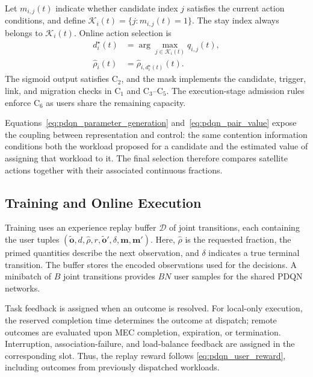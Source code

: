 Let $m_{i,j}(t)$ indicate whether candidate index $j$
satisfies the current action conditions, and define
$\mathcal{K}_i(t)=\{j:m_{i,j}(t)=1\}$.
The stay index always belongs to $\mathcal{K}_i(t)$.
Online action selection is
\begin{equation}
\begin{aligned}
d_i^\star(t)
&=\arg\max_{j\in\mathcal{K}_i(t)}q_{i,j}(t),\\
\widehat{\rho}_i(t)
&=\widehat{\rho}_{i,d_i^\star(t)}(t).
\end{aligned}
\label{eq:pdqn_joint_selection}
\end{equation}
The sigmoid output satisfies $\mathrm{C}_2$, and the mask
implements the candidate, trigger, link, and migration
checks in $\mathrm{C}_1$ and $\mathrm{C}_3$--$\mathrm{C}_5$.
The execution-stage admission rules enforce
$\mathrm{C}_6$ as users share the remaining capacity.

Equations~\eqref{eq:pdqn_parameter_generation}
and~\eqref{eq:pdqn_pair_value} expose the coupling between
representation and control: the same contention information
conditions both the workload proposed for a candidate and
the estimated value of assigning that workload to it.
The final selection therefore compares satellite actions
together with their associated continuous fractions.

\subsection{Training and Online Execution}
\label{subsec:training_execution}

Training uses an experience replay buffer $\mathcal{D}$
of joint transitions, each containing the user tuples
$(\widetilde{\mathbf{o}},d,\widehat{\rho},r,
\widetilde{\mathbf{o}}',\delta,\mathbf{m},\mathbf{m}')$.
Here, $\widehat{\rho}$ is the requested fraction,
the primed quantities describe the next observation,
and $\delta$ indicates a true terminal transition.
The buffer stores the encoded observations used for
the decisions. A minibatch of $B$ joint transitions
provides $BN$ user samples for the shared PDQN networks.

Task feedback is assigned when an outcome is resolved.
For local-only execution, the reserved completion time
determines the outcome at dispatch; remote outcomes
are evaluated upon MEC completion, expiration, or
termination. Interruption, association-failure, and
load-balance feedback are assigned in the corresponding
slot. Thus, the replay reward follows
\eqref{eq:pdqn_user_reward}, including outcomes from
previously dispatched workloads.

